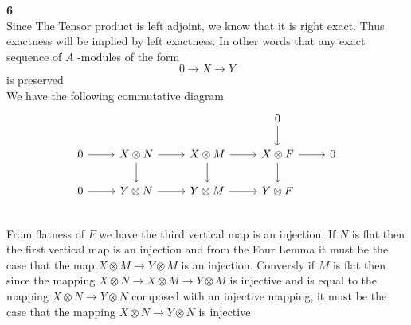 \documentclass[12pt]{article}
\newenvironment{ques}[1]{\textbf{#1}\vspace{1 mm}\\ }{\bigskip}
\theoremstyle{definition}
\newcommand{\tensor}{\otimes}
\begin{document}
\begin{ques}{6}
	Since The Tensor product is left adjoint, we know that it is right exact.
	Thus exactness will be implied by left exactness. In other words that any exact
	sequence of $A$ -modules of the form
	$$0 \to X \to Y$$
	is preserved\\
	We have the following commutative diagram 
	$$\begin{tikzcd}
	& & & 0 \arrow[d] & \\
	0 \arrow[r] & X \tensor N \arrow[r] \arrow[d] & X \tensor M \arrow[r]
	\arrow[d] & X \tensor F \arrow[r]\arrow[d] & 0\\
	0 \arrow[r] & Y \tensor N \arrow[r] & Y \tensor M \arrow[r] & Y \tensor F\\
	\end{tikzcd}$$
	From flatness of $F$ we have the third vertical map is an injection. If $N$
	is flat then the first vertical map is an injection and from the Four Lemma
	it must be the case that the map $X \tensor M \to Y \tensor M$ is an
	injection. Conversly if $M$ is flat then since the mapping $X \tensor N \to
	X \tensor M \to Y \tensor M$ is injective and is equal to the mapping $X
	\tensor N \to Y \tensor N$ composed with an injective mapping, it must be
	the case that the mapping $X \tensor N \to Y \tensor N$ is injective
\end{ques}
\end{document}
